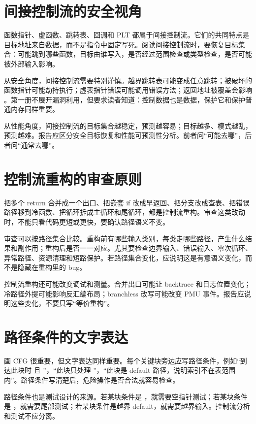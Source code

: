 \section{间接控制流的安全视角}

函数指针、虚函数、跳转表、回调和 PLT 都属于间接控制流。它们的共同特点是目标地址来自数据，而不是指令中固定写死。阅读间接控制流时，要恢复目标集合：可能跳到哪些函数，目标由谁写入，是否经过范围检查或类型检查，是否可能被外部输入影响。

从安全角度，间接控制流需要特别谨慎。越界跳转表可能变成任意跳转；被破坏的函数指针可能劫持执行；虚表指针错误可能调用错误方法；返回地址被覆盖会影响 。第一册不展开漏洞利用，但要求读者知道：控制数据也是数据，保护它和保护普通内存同样重要。

从性能角度，间接控制流的目标集合越稳定，预测越容易；目标越多、模式越乱，预测越难。报告应区分安全目标恢复和性能可预测性分析。前者问“可能去哪”，后者问“通常去哪”。

\section{控制流重构的审查原则}

把多个 return 合并成一个出口、把嵌套 if 改成早返回、把分支改成查表、把错误路径移到冷函数、把循环拆成主循环和尾循环，都是控制流重构。审查这类改动时，不能只看代码更短或更快，要确认路径语义不变。

审查可以按路径集合比较。重构前有哪些输入类别，每类走哪些路径，产生什么结果和副作用；重构后是否一一对应。尤其要检查边界输入、错误输入、零次循环、异常路径、资源清理和短路保护。若路径集合变化，应说明这是有意语义变化，而不是隐藏在重构里的 bug。

控制流重构还可能改变调试和测量。合并出口可能让 backtrace 和日志位置变化；冷路径外提可能影响反汇编布局；branchless 改写可能改变 PMU 事件。报告应说明这些变化，不要只写“等价重构”。

\section{路径条件的文字表达}

画 CFG 很重要，但文字表达同样重要。每个关键块旁边应写路径条件，例如“到达此块时  且 ”，“此块只处理 ”，“此块是 default 路径，说明索引不在表范围内”。路径条件写清楚后，危险操作是否合法就容易检查。

路径条件也是测试设计的来源。若某块条件是 ，就需要空指针测试；若某块条件是 ，就需要尾部测试；若某块条件是越界 default，就需要越界输入。控制流分析和测试不应分离。

